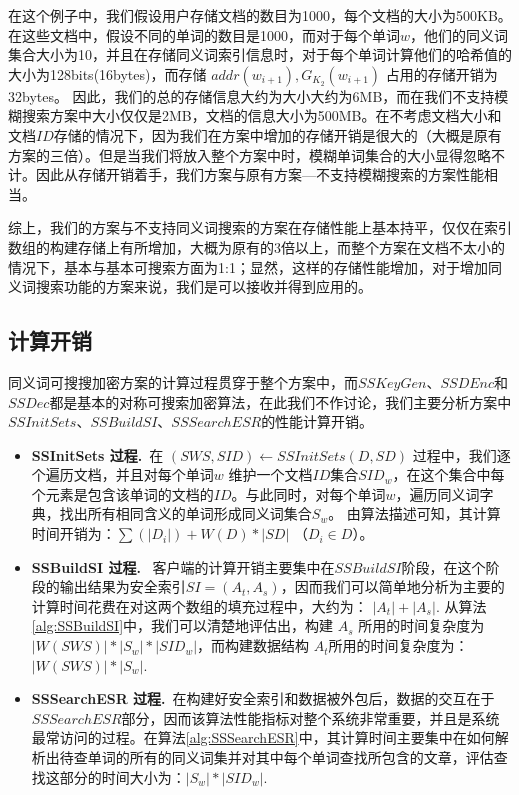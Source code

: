 在这个例子中，我们假设用户存储文档的数目为1000，每个文档的大小为500KB。在这些文档中，假设不同的单词的数目是1000，而对于每个单词$w$，他们的同义词集合大小为10，并且在存储同义词索引信息时，对于每个单词计算他们的哈希值的大小为128bits(16bytes)，而存储 $addr(w_{i+1}), G_{K_2}(w_{i+1})$ 占用的存储开销为32bytes。 因此，我们的总的存储信息大约为大小大约为6MB，而在我们不支持模糊搜索方案中大小仅仅是2MB，文档的信息大小为500MB。在不考虑文档大小和文档$ID$存储的情况下，因为我们在方案中增加的存储开销是很大的（大概是原有方案的三倍）。但是当我们将放入整个方案中时，模糊单词集合的大小显得忽略不计。因此从存储开销着手，我们方案与原有方案---不支持模糊搜索的方案性能相当。

综上，我们的方案与不支持同义词搜索的方案在存储性能上基本持平，仅仅在索引数组的构建存储上有所增加，大概为原有的3倍以上，而整个方案在文档不太小的情况下，基本与基本可搜索方面为1:1；显然，这样的存储性能增加，对于增加同义词搜索功能的方案来说，我们是可以接收并得到应用的。


\subsection{计算开销}
\label{sec:synonym_capability_search}
同义词可搜搜加密方案的计算过程贯穿于整个方案中，而$SSKeyGen$、$SSDEnc$和$SSDec$都是基本的对称可搜索加密算法，在此我们不作讨论，我们主要分析方案中$SSInitSets$、$SSBuildSI$、$SSSearchESR$的性能计算开销。

\begin{itemize}
  \item
  \textbf{SSInitSets 过程.}\
  在 ${ (SWS, SID) \leftarrow SSInitSets(D, SD)}$ 过程中，我们逐个遍历文档，并且对每个单词$w$ 维护一个文档$ID$集合$SID_w$，在这个集合中每个元素是包含该单词的文档的$ID$。与此同时，对每个单词$w$，遍历同义词字典，找出所有相同含义的单词形成同义词集合$S_w$。 由算法描述可知，其计算时间开销为：$\sum (|D_i|) + W(D) * |SD| $ （$D_i \in D$）。

  \item
  \textbf{SSBuildSI 过程.} \
  客户端的计算开销主要集中在$SSBuildSI$阶段，在这个阶段的输出结果为安全索引$SI = (A_t, A_s)$，因而我们可以简单地分析为主要的计算时间花费在对这两个数组的填充过程中，大约为： $|A_t| + |A_s|$. 从算法\ref{alg:SSBuildSI}中，我们可以清楚地评估出，构建 $A_s$ 所用的时间复杂度为 $|W(SWS)| * |S_w| * |SID_w|$，而构建数据结构 $A_t$所用的时间复杂度为：$|W(SWS)| * |S_w|$.


  \item
  \textbf{SSSearchESR 过程.}\
  在构建好安全索引和数据被外包后，数据的交互在于$SSSearchESR$部分，因而该算法性能指标对整个系统非常重要，并且是系统最常访问的过程。在算法\ref{alg:SSSearchESR}中，其计算时间主要集中在如何解析出待查单词的所有的同义词集并对其中每个单词查找所包含的文章，评估查找这部分的时间大小为：$|S_w| * |SID_w|$.


\end{itemize}

